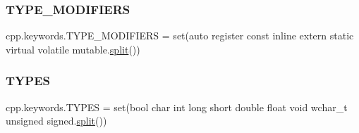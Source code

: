 \mbox{\label{namespacecpp_1_1keywords_af9282ce418d6b4b43dca5ed574caedd7}} 
\subsubsection{\texorpdfstring{TYPE\_MODIFIERS}{TYPE\_MODIFIERS}}
{\footnotesize\ttfamily cpp.\+keywords.\+T\+Y\+P\+E\+\_\+\+M\+O\+D\+I\+F\+I\+E\+RS = set(\textquotesingle{}auto register const inline extern static virtual volatile mutable\textquotesingle{}.\mbox{\hyperlink{_input_8h_aec2fd8cd9140a1b535dc54a924396f40}{split}}())}

\mbox{\label{namespacecpp_1_1keywords_a56fd5baf357970548e1ec366edfc2c13}} 
\subsubsection{\texorpdfstring{TYPES}{TYPES}}
{\footnotesize\ttfamily cpp.\+keywords.\+T\+Y\+P\+ES = set(\textquotesingle{}bool char int long short double float void wchar\+\_\+t unsigned signed\textquotesingle{}.\mbox{\hyperlink{_input_8h_aec2fd8cd9140a1b535dc54a924396f40}{split}}())}

